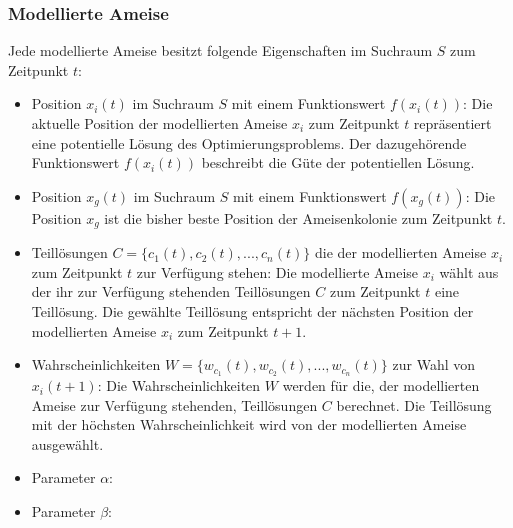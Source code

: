 \documentclass[a4paper, 11pt]{article}
\begin{document}
\subsubsection{Modellierte Ameise}
Jede modellierte Ameise besitzt folgende Eigenschaften im Suchraum $S$ zum Zeitpunkt $t$:
\begin{itemize}
	\item Position $x_{i}(t)$ im Suchraum $S$ mit einem Funktionswert $f(x_{i}(t))$: Die aktuelle Position der modellierten Ameise $x_{i}$ zum Zeitpunkt $t$ repräsentiert eine potentielle Lösung des Optimierungsproblems. Der dazugehörende Funktionswert $f(x_{i}(t))$ beschreibt die Güte der potentiellen Lösung.
	\item Position $x_{g}(t)$ im Suchraum $S$ mit einem Funktionswert $f(x_{g}(t))$: Die Position $x_{g}$ ist die bisher beste Position der Ameisenkolonie zum Zeitpunkt $t$.
	\item Teillösungen $C=\{c_{1}(t),c_{2}(t),...,c_{n}(t)\}$ die der modellierten Ameise $x_{i}$ zum Zeitpunkt $t$ zur Verfügung stehen: Die modellierte Ameise $x_{i}$ wählt aus der ihr zur Verfügung stehenden Teillösungen $C$ zum Zeitpunkt $t$ eine Teillösung. Die gewählte Teillösung entspricht der nächsten Position der modellierten Ameise $x_{i}$ zum Zeitpunkt $t+1$.
	\item Wahrscheinlichkeiten $W=\{w_{c_{1}}(t),w_{c_{2}}(t),...,w_{c_{n}}(t)\}$  zur Wahl von $x_{i}(t+1)$: Die Wahrscheinlichkeiten $W$ werden für die, der modellierten Ameise zur Verfügung stehenden, Teillösungen $C$ berechnet. Die Teillösung mit der höchsten Wahrscheinlichkeit wird von der modellierten Ameise ausgewählt.  	
	\item Parameter $\alpha$: 
	\item Parameter $\beta$: 
\end{itemize}
\newpage
\end{document}
